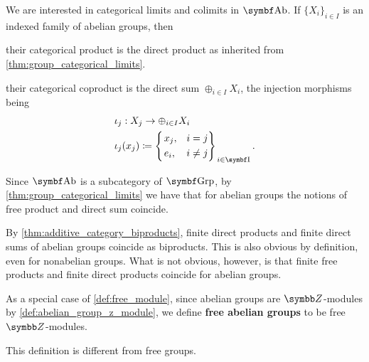 \begin{proposition}\label{thm:abelian_group_categorical_limits}
  We are interested in categorical limits and colimits in \( \Bold{Ab} \). If \( \{ X_i \}_{i \in I} \) is an indexed family of abelian groups, then
  \begin{defenum}
    \item\label{thm:abelian_group_categorical_limits/product} their categorical product is the direct product as inherited from \cref{thm:group_categorical_limits}.

    \item\label{thm:abelian_group_categorical_limits/coproduct} their categorical coproduct is the direct sum \( \oplus_{i \in I} X_i \), the injection morphisms being
    \begin{align*}
      &\iota_j: X_j \to \oplus_{i \in I} X_i \\
      &\iota_j(x_j) \coloneqq \begin{dcases}
        \begin{drcases}
          x_j, &i = j \\
          e_i, &i \neq j
        \end{drcases}
      \end{dcases}_{i \in \Bold I}.
    \end{align*}

    Since \( \Bold{Ab} \) is a subcategory of \( \Bold{Grp} \), by \cref{thm:group_categorical_limits} we have that for abelian groups the notions of free product and direct sum coincide.
  \end{defenum}
\end{proposition}

\begin{note}\label{note:abelian_group_biproducts}
  By \cref{thm:additive_category_biproducts}, finite direct products and finite direct sums of abelian groups coincide as biproducts. This is also obvious by definition, even for nonabelian groups. What is not obvious, however, is that finite free products and finite direct products coincide for abelian groups.
\end{note}

\begin{definition}\label{def:free_abelian_group}
  As a special case of \cref{def:free_module}, since abelian groups are \( \BB{Z} \)-modules by \cref{def:abelian_group_z_module}, we define \textbf{free abelian groups} to be free \( \BB{Z} \)-modules.

  This definition is different from free groups.
\end{definition}
